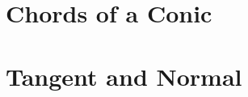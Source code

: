 \documentclass[11pt]{book}
\begin{document}
\section{ Chords of a Conic}

\section{ Tangent and Normal}

\fi
%

%
%
%
\latexprintindex
\end{document}
